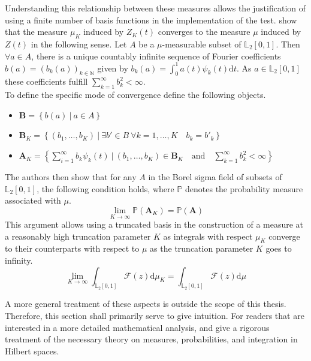 \documentclass[12pt, a4paper]{article}
\theoremstyle{MAstyle} \newtheorem{assumption}{Assumption}[section]
\theoremstyle{MAstyle} \newtheorem{definition}{Definition}[section]
\theoremstyle{MAstyle} \newtheorem{theorem}{Theorem}[section]
\begin{document}
			Understanding this relationship between these measures allows the justification of using a finite number of basis functions in the implementation of the test.
			\cite{bugni_goodness--fit_2009} show that the measure $\mu_K$ induced by $Z_K(t)$ converges to the measure $\mu$ induced by $Z(t)$ in the following sense. Let $A$ be a $\mu$-measurable subset of $\mathbb{L}_2[0,1]$. Then $\forall a \in A$, there is a unique countably infinite sequence of Fourier coefficients $b(a) = (b_k(a))_{k \in \mathbb{N}}$ given by $b_k(a) = \int_{0}^{1} a(t) \psi_k(t) \mathrm{d}t$. As $a \in \mathbb{L}_2[0,1]$ these coefficients fulfill $\sum_{k = 1}^{\infty} b_k^2 < \infty$. \\
			
			\newpage
			To define the specific mode of convergence \cite{bugni_goodness--fit_2009} define the following objects.
			\begin{itemize}
				\item $\textbf{B} = \left\{b(a) \ \vert \ a \in A\right\}$
				\item $\textbf{B}_K = \left\{\left(b_1, \dots, b_K \right) \ \vert \ \exists b' \in B \  \forall k = 1, \dots, K \quad b_k = b'_k \right\}$
				\item $\textbf{A}_K = \left\{ \sum_{i = 1}^{\infty} b_k \psi_k(t) \ \vert \ \left(b_1, \dots, b_K \right) \in \textbf{B}_K \quad \text{and} \quad \sum_{k = 1}^{\infty} b_k^2 < \infty \right\}$
			\end{itemize}
			The authors then show that for any $A$ in the Borel sigma field of subsets of $\mathbb{L}_2[0,1]$, the following condition holds, where $\mathbb{P}$ denotes the probability measure associated with $\mu$.
			\begin{equation}
				\lim_{K \rightarrow \infty} \mathbb{P}(\textbf{A}_K) = \mathbb{P}(\textbf{A})
			\end{equation}
			This argument allows using a truncated basis in the construction of a measure at a reasonably high truncation parameter $K$ as integrals with respect $\mu_K$ converge to their counterparts with respect to $\mu$ as the truncation parameter $K$ goes to infinity.
			\begin{equation}
				\lim_{K \rightarrow \infty} \int_{\mathbb{L}_2[0,1]} \mathcal{F}(z) \mathrm{d}\mu_K = \int_{\mathbb{L}_2[0,1]} \mathcal{F}(z) \mathrm{d}\mu
			\end{equation}
			
			A more general treatment of these aspects is outside the scope of this thesis. Therefore, this section shall primarily serve to give intuition. For readers that are interested in a more detailed mathematical analysis, \cite{gihman_theory_2004} and \cite{skorohod_integration_1974} give a rigorous treatment of the necessary theory on measures, probabilities, and integration in Hilbert spaces. 
		
\end{document}
